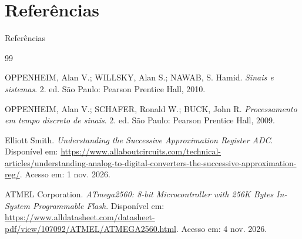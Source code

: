 \documentclass{beamer}
\begin{document}
\section{Referências}

\begin{frame}{Referências}
    \footnotesize

    \begin{thebibliography}{99}

    OPPENHEIM, Alan V.; WILLSKY, Alan S.; NAWAB, S. Hamid.
    \textit{Sinais e sistemas}.
    2. ed. São Paulo: Pearson Prentice Hall, 2010.

    OPPENHEIM, Alan V.; SCHAFER, Ronald W.; BUCK, John R.
    \textit{Processamento em tempo discreto de sinais}.
    2. ed. São Paulo: Pearson Prentice Hall, 2009.

    Elliott Smith.
    \textit{Understanding the Successive Approximation Register ADC}.
    Disponível em:
    \url{https://www.allaboutcircuits.com/technical-articles/understanding-analog-to-digital-converters-the-successive-approximation-reg/}.
    Acesso em: 1 nov. 2026.

     ATMEL Corporation. \textit{ATmega2560: 8-bit Microcontroller with 256K Bytes In-System Programmable Flash}. Disponível em: \url{https://www.alldatasheet.com/datasheet-pdf/view/107092/ATMEL/ATMEGA2560.html}. Acesso em: 4 nov. 2026.

    \end{thebibliography}
\end{frame}
\end{document}
